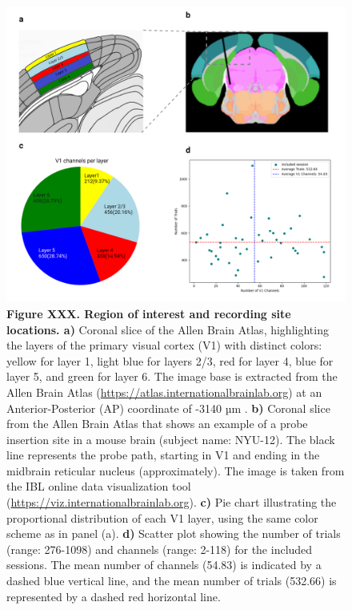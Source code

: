 \documentclass[
  letterpaper,
  DIV=11,
  numbers=noendperiod]{scrartcl}
\begin{document}
\begin{figure}[H]

{\centering \includegraphics[width=5.97917in,height=\textheight]{images/summary.png}

}

\caption{\textbf{Figure XXX. Region of interest and recording site
locations. a)} Coronal slice of the Allen Brain Atlas, highlighting the
layers of the primary visual cortex (V1) with distinct colors: yellow
for layer 1, light blue for layers 2/3, red for layer 4, blue for layer
5, and green for layer 6. The image base is extracted from the Allen
Brain Atlas (\url{https://atlas.internationalbrainlab.org}) at an
Anterior-Posterior (AP) coordinate of -3140 µm . \textbf{b)} Coronal
slice from the Allen Brain Atlas that shows an example of a probe
insertion site in a mouse brain (subject name: NYU-12). The black line
represents the probe path, starting in V1 and ending in the midbrain
reticular nucleus (approximately). The image is taken from the IBL
online data visualization tool
(\url{https://viz.internationalbrainlab.org}). \textbf{c)} Pie chart
illustrating the proportional distribution of each V1 layer, using the
same color scheme as in panel (a). \textbf{d)} Scatter plot showing the
number of trials (range: 276-1098) and channels (range: 2-118) for the
included sessions. The mean number of channels (54.83) is indicated by a
dashed blue vertical line, and the mean number of trials (532.66) is
represented by a dashed red horizontal line.}

\end{figure}%
\end{document}
